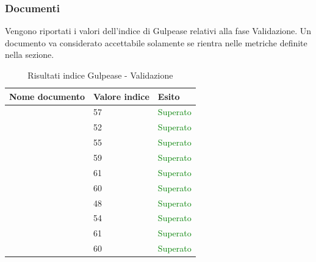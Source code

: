 	 	\subsubsection{Documenti}	 	
	 	Vengono riportati i valori dell'indice di Gulpease relativi alla fase Validazione. Un documento va considerato accettabile solamente se rientra nelle metriche definite nella sezione.
		\begin{table}[!ht]
			\begin{center}
				\begin{tabularx}{0.9\textwidth}{|l|l|X|}
					\hline
					\textbf{Nome documento} & \textbf{Valore indice} & \textbf{Esito}\\
					\hline						
					\docNameVersionAdR & 57 & \textcolor{green}{Superato}\\
					\hline
					\docNameVersionDdP & 52 & \textcolor{green}{Superato}\\
					\hline
					\docNameVersionGlo & 55 & \textcolor{green}{Superato}\\
					\hline					
					\docNameVersionNdP & 59 & \textcolor{green}{Superato}\\
					\hline					
					\docNameVersionPdP & 61 & \textcolor{green}{Superato}\\
					\hline					
					\docNameVersionPdQ & 60 & \textcolor{green}{Superato}\\
					\hline					
					\docNameVersionSdF & 48 & \textcolor{green}{Superato}\\
					\hline	
					\docNameVersionST & 54 & \textcolor{green}{Superato}\\
					\hline			
					\docVersionMA & 61 & \textcolor{green}{Superato}\\
					\hline
					\docVersionMU & 60 & \textcolor{green}{Superato}\\		
					\hline
				\end{tabularx}
			\end{center}
			\caption{Risultati indice Gulpease - Validazione}
		\end{table}
		
